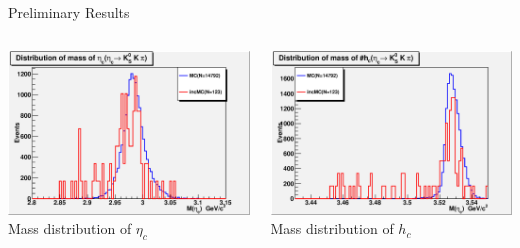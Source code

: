 \documentclass{beamer}
\begin{document}
\begin{frame}{Preliminary Results}
\begin{columns}
\begin{column}{0.5\textwidth}
\begin{center}
\includegraphics[width=1\textwidth,angle=0]{figures/Pi0hc_invariant_mass_of_etac.eps}\\
Mass distribution of $\eta_c$
\end{center}
\end{column}
\begin{column}{0.5\textwidth}
\begin{center}
\includegraphics[width=1\textwidth,angle=0]{figures/Pi0hc_invariant_mass_of_hc.eps}\\
Mass distribution of $h_c$
\end{center}
\end{column}
\end{columns}
\end{frame}
\end{document}
